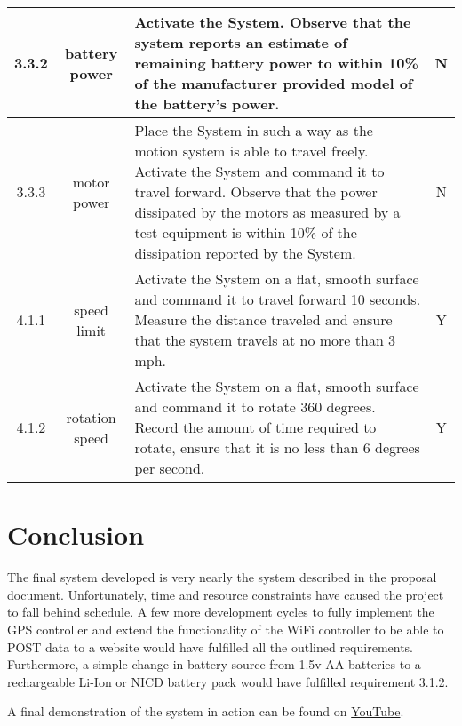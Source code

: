 \documentclass{article}
\begin{document}
\begin{tabular}{|c|c|p{8cm}|c|}
  \hline
  3.3.2 & battery power & Activate the System.  Observe that the system reports an estimate of remaining battery power to within 10\% of the manufacturer provided model of the battery's power. & N \\\hline
  3.3.3 & motor power & Place the System in such a way as the motion system is able to travel freely.  Activate the System and command it to travel forward.  Observe that the power dissipated by the motors as measured by a test equipment is within 10\% of the dissipation reported by the System. & N \\\hline
  4.1.1 & speed limit & Activate the System on a flat, smooth surface and command it to travel forward 10 seconds.  Measure the distance traveled and ensure that the system travels at no more than 3 mph. & Y \\\hline
  4.1.2 & rotation speed & Activate the System on a flat, smooth surface and command it to rotate 360 degrees.  Record the amount of time required to rotate, ensure that it is no less than 6 degrees per second. & Y \\\hline

\end{tabular}

\section*{Conclusion}
The final system developed is very nearly the system described in the proposal document.  Unfortunately, time and resource constraints have caused the project to fall behind schedule.  A few more development cycles to fully implement the GPS controller and extend the functionality of the WiFi controller to be able to POST data to a website would have fulfilled all the outlined requirements.  Furthermore, a simple change in battery source from 1.5v AA batteries to a rechargeable Li-Ion or NICD battery pack would have fulfilled requirement 3.1.2.

A final demonstration of the system in action can be found on \href{https://www.youtube.com/watch?v=gsIGP2L7iuk}{YouTube}.





\end{document}
